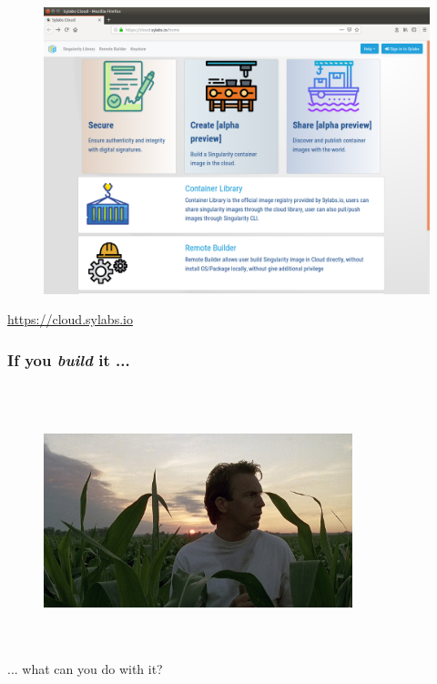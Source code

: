 \documentclass{beamer}
\begin{document}
\begin{frame}
   \frametitle{}
   \begin{figure}[htbp]
      \includegraphics[width=1.0\textwidth]{images/sylabs-cloud.png}
   \end{figure}
   \begin{center}
      \url{https://cloud.sylabs.io}
   \end{center}
\end{frame}

\begin{frame}
   \frametitle{If you \textit{build} it ...}
   \vspace{-1.0em}
   \ \\ \ \\
   \begin{figure}[htbp]
      \includegraphics[width=0.8\textwidth]{images/field-of-dreams-corn.jpg}
   \end{figure}
   \ \\ \ \\
   \hspace{6cm} ... what can you do with it?
\end{frame}
\end{document}
